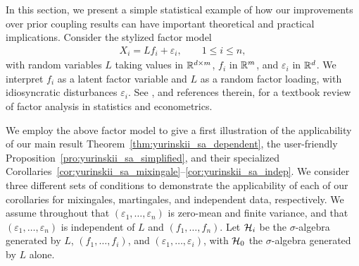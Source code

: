 In this section, we present a simple statistical example of how our
improvements over prior coupling results can have important theoretical and
practical implications. Consider the stylized factor model
%
\begin{align*}
  X_i = L f_i + \varepsilon_i, \qquad 1 \leq i \leq n,
\end{align*}
%
with random variables $L$ taking values in $\mathbb{R}^{d \times m}$, $f_i$ in $\mathbb{R}^m$,
and $\varepsilon_i$ in $\mathbb{R}^d$. We interpret $f_i$ as a latent factor variable
and $L$ as a random factor loading, with idiosyncratic disturbances
$\varepsilon_i$. See \citet{fan2020statistical}, and references therein, for a
textbook review of factor analysis in statistics and econometrics.

We employ the above factor model to give a first illustration of the
applicability of our main result Theorem~\ref{thm:yurinskii_sa_dependent}, the
user-friendly Proposition~\ref{pro:yurinskii_sa_simplified}, and their
specialized
Corollaries~\ref{cor:yurinskii_sa_mixingale}--\ref{cor:yurinskii_sa_indep}. We
consider three different sets of conditions to demonstrate the applicability of
each of our corollaries for mixingales, martingales, and independent data,
respectively. We assume throughout that
$(\varepsilon_1, \ldots, \varepsilon_n)$ is zero-mean and finite variance, and
that $(\varepsilon_1, \ldots, \varepsilon_n)$ is independent
of $L$ and $(f_1, \ldots, f_n)$. Let $\mathcal{H}_i$ be the $\sigma$-algebra generated
by $L$, $(f_1, \ldots, f_i)$, and $(\varepsilon_1, \ldots, \varepsilon_i)$, with
$\mathcal{H}_0$ the $\sigma$-algebra generated by $L$ alone.

